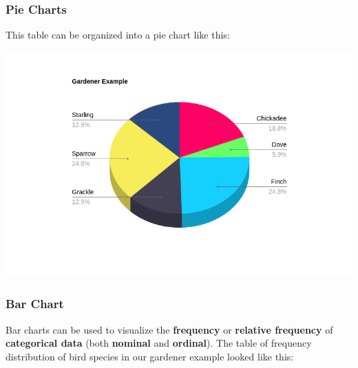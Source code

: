 \documentclass[aspectratio=169,11pt,svgnames]{beamer}
\begin{document}
\begin{frame}
 \frametitle{Pie Charts}
 This table can be organized into a pie chart like this:
 \begin{center}
  \vspace*{-1em}
  \includegraphics[width=.9\textwidth]{gardener_pie.png}
 \end{center}
\end{frame}

\begin{frame}
 \frametitle{Bar Chart}
 Bar charts can be used to visualize the \textbf{frequency} or \textbf{relative
 frequency} of \textbf{categorical data} (both \textbf{nominal} and
 \textbf{ordinal}). \pause
 The table of frequency distribution of bird species in our gardener example
 looked like this:
\end{frame}
\end{document}
